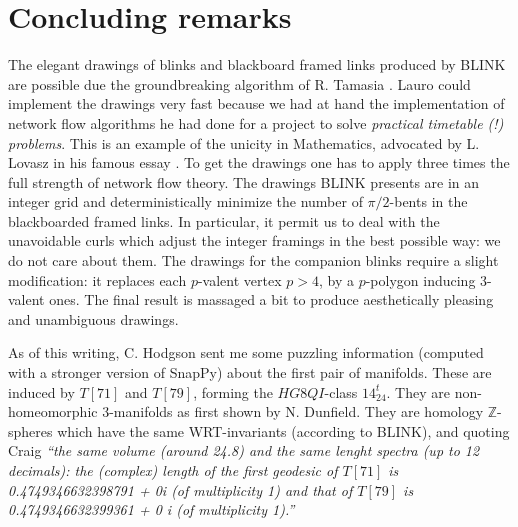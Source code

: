 \section{Concluding remarks}
The elegant drawings of blinks and blackboard framed links produced by BLINK are 
possible due the groundbreaking algorithm of R. Tamasia \cite{tamassia1987egg}.
Lauro could implement the drawings very fast because we had at hand the implementation of
network flow algorithms he had done for a project to solve {\em practical timetable (!) problems}.
This is an example of the unicity in Mathematics, advocated by L. Lovasz in his famous essay \cite{lovasz1998om}.
To get the drawings one has to apply three times the full strength of network flow theory.
The drawings BLINK presents are in an integer grid and 
deterministically minimize the number of $\pi/2$-bents in the blackboarded framed links.
In particular, it permit us to deal with the unavoidable curls which adjust the integer framings in
the best possible way: we do not care about them. 
The drawings for the companion blinks require a slight modification: it replaces each $p$-valent vertex $p>4$,
by a $p$-polygon inducing 3-valent ones. The final result is massaged a bit to
produce aesthetically pleasing and unambiguous drawings.

As of this writing, C. Hodgson sent me some puzzling 
information (computed with a stronger version of SnapPy) about the first pair of 
manifolds. These are induced by $T[71]$ and $T[79]$, forming the $HG8QI$-class $14_{24}^t$.
They are non-homeomorphic 3-manifolds as first shown by N. Dunfield.
They are homology $\mathbb{Z}$-spheres which have the same WRT-invariants 
(according to BLINK), and quoting Craig {\em ``the same volume (around 24.8) and the same lenght spectra (up to 12 decimals):
the (complex) length of the first geodesic of $T[71]$ is 
0.4749346632398791 + 0i  (of multiplicity 1) 
and that of $T[79]$ is 0.4749346632399361 + 0 i  (of multiplicity 1).''}

